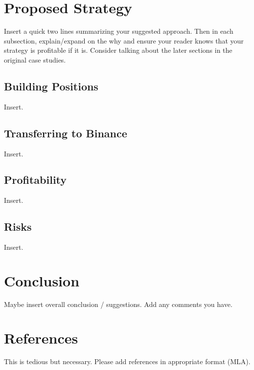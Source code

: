 \documentclass{article}
\begin{document}
\section{Proposed Strategy}
Insert a quick two lines summarizing your suggested approach. Then in each subsection, explain/expand on the why and ensure your reader knows that your strategy is profitable if it is. Consider talking about the later sections in the original case studies.
\subsection{Building Positions}
Insert.
\subsection{Transferring to Binance}
Insert.
\subsection{Profitability}
Insert.
\subsection{Risks}
Insert.

\section{Conclusion}
Maybe insert overall conclusion / suggestions. Add any comments you have.

\section{References}
This is tedious but necessary. Please add references in appropriate format (MLA).
\end{document}

